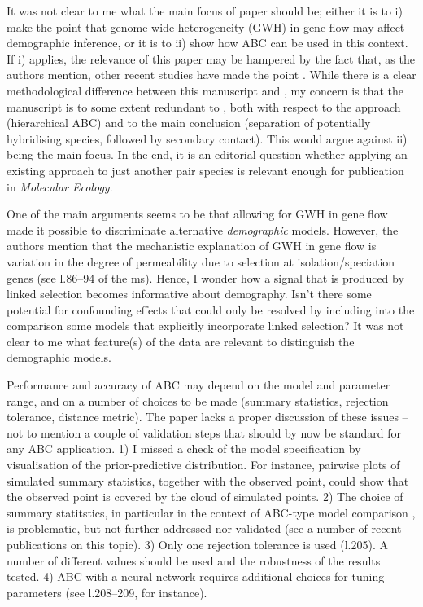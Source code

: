 \documentclass[11pt]{article}
\newenvironment{my_enumerate}
{\begin{enumerate}
  \setlength{\itemsep}{2pt}
  \setlength{\parskip}{0pt}
  \setlength{\parsep}{0pt}}
{\end{enumerate}}
\begin{document}
\begin{my_enumerate}
	\item It was not clear to me what the main focus of paper should be; either it is to i) make the point that genome-wide heterogeneity (GWH) in gene flow may affect demographic inference, or it is to ii) show how ABC can be used in this context. If i) applies, the relevance of this paper may be hampered by the fact that, as the authors mention, other recent studies have made the point \citep{Sousa:2013fk, Roux:2013fk}. While there is a clear methodological difference between this manuscript and \citet{Sousa:2013fk}, my concern is that the manuscript is to some extent redundant to \citet{Roux:2013fk}, both with respect to the approach (hierarchical ABC) and to the main conclusion (separation of potentially hybridising species, followed by secondary contact). This would argue against ii) being the main focus. In the end, it is an editorial question whether applying an existing approach to just another pair species is relevant enough for publication in \emph{Molecular Ecology}.
	\item One of the main arguments seems to be that allowing for GWH in gene flow made it possible to discriminate alternative \emph{demographic} models. However, the authors mention that the mechanistic explanation of GWH in gene flow is variation in the degree of permeability due to selection at isolation/speciation genes (see l.86--94 of the ms). Hence, I wonder how a signal that is produced by linked selection becomes informative about demography. Isn't there some potential for confounding effects that could only be resolved by including into the comparison some models that explicitly incorporate linked selection? It was not clear to me what feature(s) of the data are relevant to distinguish the demographic models.
	\item Performance and accuracy of ABC may depend on the model and parameter range, and on a number of choices to be made (summary statistics, rejection tolerance, distance metric). The paper lacks a proper discussion of these issues -- not to mention a couple of validation steps that should by now be standard for any ABC application. 1) I missed a check of the model specification by visualisation of the prior-predictive distribution. For instance, pairwise plots of simulated summary statistics, together with the observed point, could show that the observed point is covered by the cloud of simulated points. 2) The choice of summary statitstics, in particular in the context of ABC-type model comparison \citep{Robert:2011fk}, is problematic, but not further addressed nor validated (see a number of recent publications on this topic). 3) Only one rejection tolerance is used (l.205). A number of different values should be used and the robustness of the results tested. 4) ABC with a neural network requires additional choices for tuning parameters (see l.208--209, for instance).

\end{my_enumerate}
\end{document}
